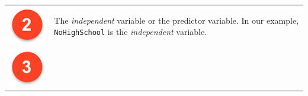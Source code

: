 \documentclass[]{article}
\begin{document}
\begin{longtable}[]{@{}ll@{}}
\begin{minipage}[t]{0.07\columnwidth}
\includegraphics[width=1\textwidth,height=\textheight]{./img/circle2.png}\strut
\end{minipage} & \begin{minipage}[t]{0.87\columnwidth}\raggedright
The \emph{independent} variable or the predictor variable. In our example, \texttt{NoHighSchool} is the \emph{independent} variable.\strut
\end{minipage}\tabularnewline
\begin{minipage}[t]{0.07\columnwidth}\raggedright
\includegraphics[width=1\textwidth,height=\textheight]{./img/circle3.png}\strut

\end{minipage}
\end{longtable}
\end{document}
